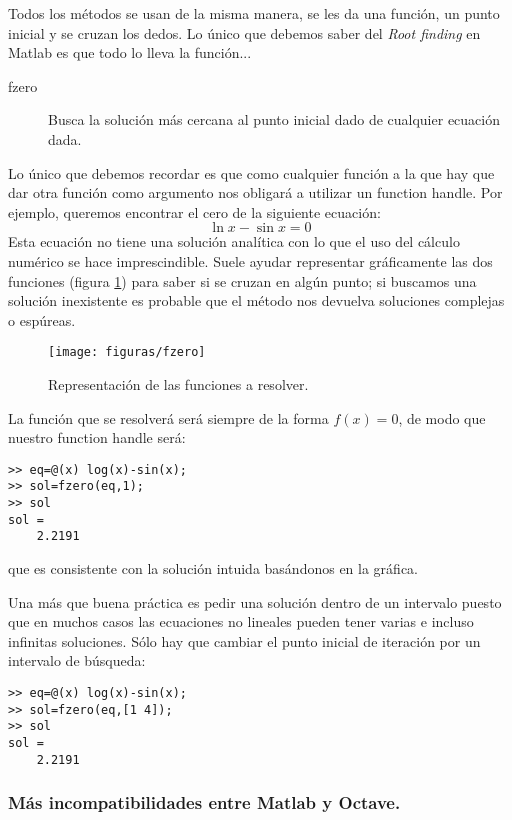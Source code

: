 Todos los métodos se usan de la misma manera, se les da una función,
un punto inicial y se cruzan los dedos. Lo único que debemos saber del
\emph{Root finding} en Matlab es que todo lo lleva la función...

\begin{description}
\item [fzero]Busca la solución más cercana al punto
  inicial dado de cualquier ecuación dada.
\end{description}
Lo único que debemos recordar es que como cualquier función a la que
hay que dar otra función como argumento nos obligará a utilizar un
function handle. Por ejemplo, queremos encontrar el cero de la
siguiente ecuación:
$$ \ln x-\sin x=0$$
Esta ecuación no tiene una solución analítica con lo que el uso del
cálculo numérico se hace imprescindible. Suele ayudar representar
gráficamente las dos funciones (figura
\ref{cap:Representación}) para saber si se cruzan en algún
punto; si buscamos una solución inexistente es probable que el método
nos devuelva soluciones complejas o espúreas.

%
\begin{figure}[h]
  \centering{}

  \texttt{[image: figuras/fzero]}


  \caption{\label{cap:Representación}Representación de las
    funciones a resolver.}
\end{figure}


La función que se resolverá será siempre de la forma $f(x)=0$, de modo
que nuestro function handle será:

  \begin{verbatim}
>> eq=@(x) log(x)-sin(x);
>> sol=fzero(eq,1);
>> sol
sol =
    2.2191 
\end{verbatim}
que es consistente con la solución intuida basándonos en la gráfica.

Una más que buena práctica es pedir una solución dentro de un
intervalo puesto que en muchos casos las ecuaciones no lineales pueden
tener varias e incluso infinitas soluciones. Sólo hay que cambiar el
punto inicial de iteración por un intervalo de búsqueda:

  \begin{verbatim}
>> eq=@(x) log(x)-sin(x);
>> sol=fzero(eq,[1 4]);
>> sol
sol =
    2.2191 
\end{verbatim}

\subsubsection{Más incompatibilidades entre Matlab y Octave.}

